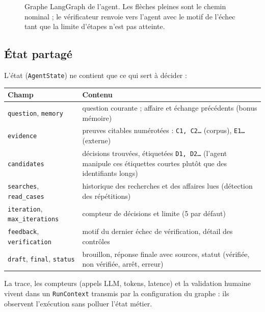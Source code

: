 \documentclass[11pt,a4paper]{article}
\begin{document}
\begin{figure}[H]
\caption{Graphe LangGraph de l'agent. Les flèches pleines sont le chemin nominal ; le vérificateur renvoie
vers l'agent avec le motif de l'échec tant que la limite d'étapes n'est pas atteinte.}
\label{fig:archi}
\end{figure}

\subsection{État partagé}
L'état (\texttt{AgentState}) ne contient que ce qui sert à décider :
\begin{center}\small
\begin{tabularx}{\textwidth}{@{}l X@{}}
\toprule
Champ & Contenu \\ \midrule
\texttt{question}, \texttt{memory} & question courante ; affaire et échange précédents (bonus mémoire) \\
\texttt{evidence} & preuves citables numérotées : \texttt{C1, C2\ldots} (corpus), \texttt{E1\ldots} (externe) \\
\texttt{candidates} & décisions trouvées, étiquetées \texttt{D1, D2\ldots} (l'agent manipule ces étiquettes courtes plutôt que des identifiants longs) \\
\texttt{searches}, \texttt{read\_cases} & historique des recherches et des affaires lues (détection des répétitions) \\
\texttt{iteration}, \texttt{max\_iterations} & compteur de décisions et limite (5 par défaut) \\
\texttt{feedback}, \texttt{verification} & motif du dernier échec de vérification, détail des contrôles \\
\texttt{draft}, \texttt{final}, \texttt{status} & brouillon, réponse finale avec sources, statut (vérifiée, non vérifiée, arrêt, erreur) \\
\bottomrule
\end{tabularx}
\end{center}
La trace, les compteurs (appels LLM, tokens, latence) et la validation humaine vivent dans un
\texttt{RunContext} transmis par la configuration du graphe : ils observent l'exécution sans polluer
l'état métier.
\end{document}
